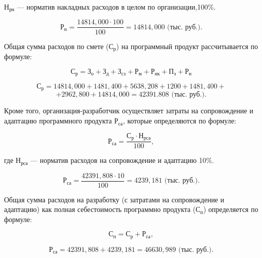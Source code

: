 \(\text{Н}_{\text{рн}}\) --- норматив накладных расходов в целом по организации,100\%.

\begin{equation}
  \text{Р}_{\text{н}} = \frac{14814,000 \cdot 100}{100} = 14814,000 \text{ (тыс. руб.)}.
\end{equation}

Общая сумма расходов по смете (\(\text{С}_{\text{р}}\)) на программный продукт рассчитывается по формуле:

\begin{equation}
  \text{С}_{\text{р}} = \text{З}_{\text{о}} + \text{З}_{\text{д}} + \text{З}_{\text{сз}} + \text{Р}_{\text{м}} + \text{Р}_{\text{нк}} + \text{П}_{\text{з}} + \text{Р}_{\text{н}}
\end{equation}

\begin{equation}
  \text{С}_{\text{р}} = 14814,000+1481,400+5638,208+1200+1481,400+
\end{equation}
\begin{equation}
  +2962,800+14814,000=42391.808 \text{ (тыс. руб.)}.
\end{equation}


Кроме того, организация-разработчик осуществляет затраты на сопровождение и адаптацию программного продукта \(\text{Р}_{\text{са}}\), которые определяются по формуле:

\begin{equation}
  \text{Р}_{\text{са}} = \frac{\text{С}_{\text{р}} \cdot \text{Н}_{\text{рса}}}{100},
\end{equation}

где \(\text{Н}_{\text{рса}}\) --- норматив расходов на сопровождение и адаптацию 10\%.

\begin{equation}
  \text{Р}_{\text{са}} = \frac{42391,808 \cdot 10}{100} = 4239,181 \text{ (тыс. руб.)}.
\end{equation}

Общая сумма расходов на разработку (с затратами на сопровождение и адаптацию) как полная себестоимость программно продукта (\(\text{С}_{\text{п}}\)) определяется по формуле:

\begin{equation}
  \text{С}_{\text{п}} = \text{С}_{\text{р}} + \text{Р}_{\text{са}},
\end{equation}

\begin{equation}
  \text{Р}_{\text{са}} = 42391,808+4239,181 = 46630,989 \text{ (тыс. руб.)}.
\end{equation}

